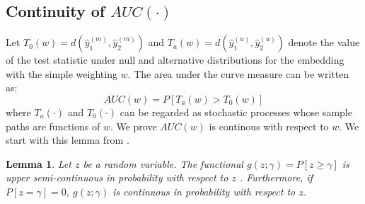 \documentclass[12pt]{article} %
\newtheorem{lem}{Lemma}
\begin{document}
 
\subsection{Continuity of $AUC(\cdot)$} 
 Let $T_0(w)=d(\hat{y}_{1}^{{(m)}},\hat{y}_{2}^{{(m)}})$ and $T_a(w)=d(\hat{y}_{1}^{(u)},\hat{y}_{2}^{(u)})$ denote the value of the test statistic under null and alternative distributions  for the embedding with the simple weighting $w$.  %
The area under the curve measure can be written as: $$AUC(w)=P\left[T_a(w)>T_0(w)\right]$$ where $T_a(\cdot)$ and $T_0(\cdot)$  can be regarded as  stochastic processes whose sample paths are functions  of $w$. We prove $AUC(w)$ is continous with respect to $w$.
We start with this lemma from \cite{Raik1972}.

\begin{lem}
Let $z$ be a random variable. The functional $g(z;\gamma) = P\left[z \geq \gamma \right]$ is upper semi-continuous in probability with respect to $z$ . Furthermore, if $P\left[z = \gamma \right]=0$, $g(z;\gamma)$ is continuous in probability with respect to $z$. \label{lemma_1}
\end{lem}
\end{document}
